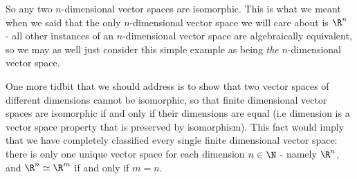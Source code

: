 So any two \( n \)-dimensional vector spaces are isomorphic. This is what we meant when we said that the only \( n \)-dimensional vector space we will care about is \( \R^n \) - all other instances of an \( n \)-dimensional vector space are algebraically equivalent, so we may as well just consider this simple example as being \emph{the} \( n \)-dimensional vector space.

\vspace{3mm}

One more tidbit that we should address is to show that two vector spaces of different dimensions cannot be isomorphic, so that finite dimensional vector spaces are isomorphic if and only if their dimensions are equal (i.e dimension is a vector space property that is preserved by isomorphism). This fact would imply that we have completely classified every single finite dimensional vector space: there is only one unique vector space for each dimension \( n\in\N \) - namely \( \R^n \), and \( \R^n\simeq\R^m \) if and only if \( m=n \).

